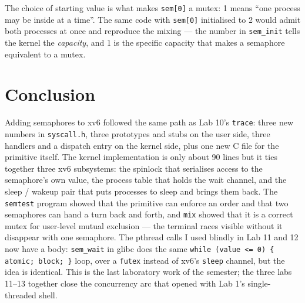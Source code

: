 \documentclass[12pt,a4paper]{article}
\begin{document}
The choice of starting value is what makes \texttt{sem[0]} a mutex: 1 means ``one process may be inside at a time''. The same code with \texttt{sem[0]} initialised to 2 would admit both processes at once and reproduce the mixing --- the number in \texttt{sem\_init} tells the kernel the \emph{capacity}, and 1 is the specific capacity that makes a semaphore equivalent to a mutex.

\section*{Conclusion}

Adding semaphores to xv6 followed the same path as Lab 10's \texttt{trace}: three new numbers in \texttt{syscall.h}, three prototypes and stubs on the user side, three handlers and a dispatch entry on the kernel side, plus one new C file for the primitive itself. The kernel implementation is only about 90 lines but it ties together three xv6 subsystems: the spinlock that serialises access to the semaphore's own value, the process table that holds the wait channel, and the sleep / wakeup pair that puts processes to sleep and brings them back. The \texttt{semtest} program showed that the primitive can enforce an order and that two semaphores can hand a turn back and forth, and \texttt{mix} showed that it is a correct mutex for user-level mutual exclusion --- the terminal races visible without it disappear with one semaphore. The pthread calls I used blindly in Lab 11 and 12 now have a body: \texttt{sem\_wait} in glibc does the same \texttt{while (value <= 0) \{ atomic; block; \}} loop, over a \texttt{futex} instead of xv6's \texttt{sleep} channel, but the idea is identical. This is the last laboratory work of the semester; the three labs 11--13 together close the concurrency arc that opened with Lab 1's single-threaded shell.
\end{document}
